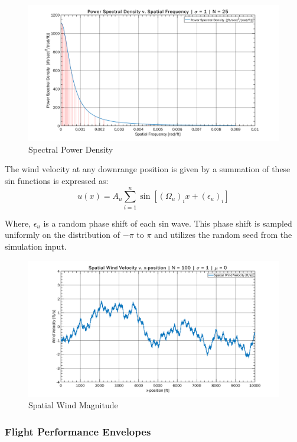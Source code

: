\documentclass[10pt,a4paper]{article}
\begin{document}
\begin{figure}[h!]
	\centering
	\includegraphics[width=1\textwidth]{./figs/dryden.png}
	\caption{Spectral Power Density}
	\label{fig:dryden}
\end{figure}
The wind velocity at any downrange position is given by a summation of these sin functions is expressed as:
\begin{equation}
u(x) = A_u\sum _{i=1}^{n}\sin[(\Omega_u)_ix+(\epsilon_u)_i]
\label{eq:wind_vel}
\end{equation}


Where, $\epsilon_u$ is a random phase shift of each sin wave. This phase shift is sampled uniformly on the distribution of $-\pi$ to $\pi$ and utilizes the random seed from the simulation input. 
\begin{figure}[h!]
	\centering
	\includegraphics[width=1\textwidth]{./figs/wind.png}
	\caption{Spatial Wind Magnitude}
	\label{fig:wind}
\end{figure}

\subsubsection{Flight Performance Envelopes}
\end{document}
